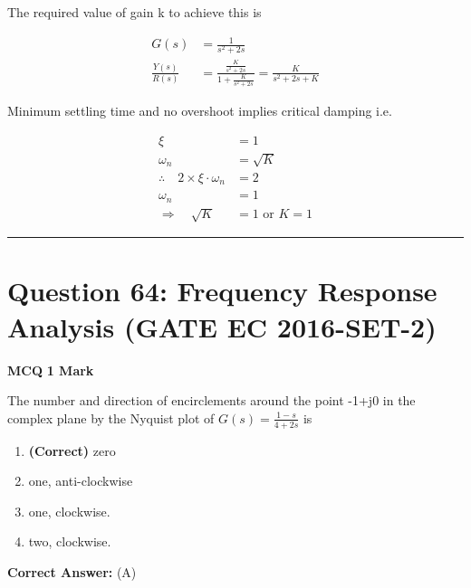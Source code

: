 \documentclass[11pt,a4paper]{article}
\begin{document}
 The required value of gain k to achieve this is \underline{\hspace{1.5cm}}


\begin{tcolorbox}[solbox, title=Detailed Solution -- Question 63]
\[
\begin{aligned} G(s)&=\frac{1}{s^{2}+2 s} \\ \frac{Y(s)}{R(s)}&=\frac{\frac{K}{s^{2}+2 s}}{1+\frac{K}{s^{2}+2 s}}=\frac{K}{s^{2}+2 s+K} \end{aligned}
\]

 Minimum settling time and no overshoot implies critical damping i.e.

\[
\begin{aligned} \xi &=1 \\ \omega_{n} &=\sqrt{K} \\ \therefore \quad 2 \times \xi \cdot \omega_{n} &=2 \\ \omega_{n} &=1 \\ \Rightarrow \quad \sqrt{K} &=1 \text { or } K=1 \end{aligned}
\]
\end{tcolorbox}

\vspace{1.5em}
\hrule
\vspace{1.5em}

\section*{Question 64: Frequency Response Analysis (GATE EC 2016-SET-2)}
\noindent \textbf{\color{primary}MCQ} \hfill \textbf{\color{secondary}1 Mark}


\noindent The number and direction of encirclements around the point -1+j0 in the complex plane by the Nyquist plot of $G(s)=\frac{1-s}{4+2s}$ is


\begin{enumerate}[label=(\Alph*)]
    \item \textbf{(Correct)} zero
    \item one, anti-clockwise
    \item one, clockwise.
    \item two, clockwise.
\end{enumerate}

\noindent \textbf{Correct Answer:} (A)
\end{document}
